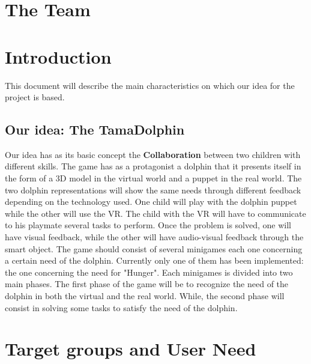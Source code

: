\documentclass [12pt]{article}
\begin{document}
\section{The Team}

\tableofcontents

\section{Introduction}
This document will describe the main characteristics on which our idea for the project is based.
\subsection{Our idea: The TamaDolphin}
Our idea has as its basic concept the \textbf{Collaboration} between two children with different skills.
The game has as a protagonist a dolphin that it presents itself in the form of a 3D model in the virtual world and a puppet in the real world. The two dolphin representations will show the same needs through different feedback depending on the technology used.
One child will play with the dolphin puppet while the other will use the VR.
The child with the VR will have to communicate to his playmate several tasks to perform. Once the problem is solved, one will have visual feedback, while the other will have audio-visual feedback through the smart object.
The game should consist of several minigames each one concerning a certain need of the dolphin. Currently only one of them has been implemented: the one concerning the need for "Hunger". Each minigames is divided into two main phases. 
The first phase of the game will be to recognize the need of the dolphin in both the virtual and the real world. While, the second phase  will consist in solving some tasks to satisfy the need of the dolphin.




\section{Target groups and User Need}
\end{document}

